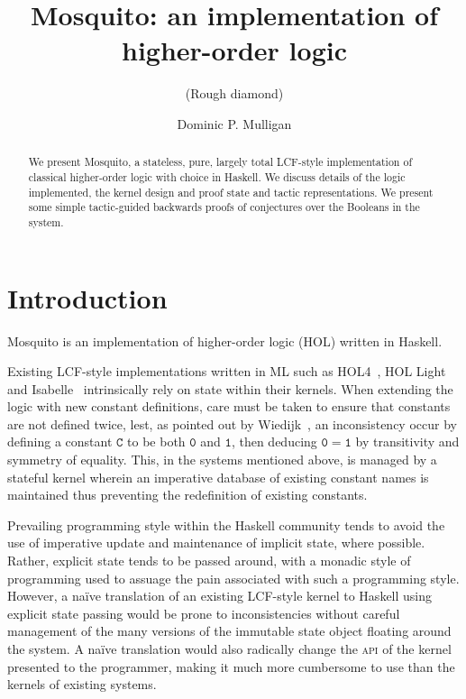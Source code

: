 \documentclass{llncs}
\author{Dominic P. Mulligan}
\title{Mosquito: an implementation of higher-order logic}
\subtitle{(Rough diamond)}
\institute{Computer Laboratory, University of Cambridge}
\newcommand{\mosquito}{Mosquito\xspace}
\begin{document}
\maketitle

\begin{abstract}
We present \mosquito, a stateless, pure, largely total LCF-style implementation of classical higher-order logic with choice in Haskell.
We discuss details of the logic implemented, the kernel design and proof state and tactic representations.
We present some simple tactic-guided backwards proofs of conjectures over the Booleans in the system.
\end{abstract}

\section{Introduction}
\label{sect.introduction}

\mosquito is an implementation of higher-order logic (HOL) written in Haskell.

Existing LCF-style implementations written in ML such as HOL4~\cite{gordon:introduction:1993}, HOL Light~\cite{harrison:hol:2009} and Isabelle~\cite{wenzel:isabelle:2008} intrinsically rely on state within their kernels.
When extending the logic with new constant definitions, care must be taken to ensure that constants are not defined twice, lest, as pointed out by Wiedijk~\cite{wiedijk:stateless:2011}, an inconsistency occur by defining a constant $\mathtt{C}$ to be both $\mathtt{0}$ and $\mathtt{1}$, then deducing $\mathtt{0 = 1}$ by transitivity and symmetry of equality.
This, in the systems mentioned above, is managed by a stateful kernel wherein an imperative database of existing constant names is maintained thus preventing the redefinition of existing constants.

Prevailing programming style within the Haskell community tends to avoid the use of imperative update and maintenance of implicit state, where possible.
Rather, explicit state tends to be passed around, with a monadic style of programming used to assuage the pain associated with such a programming style.
However, a na\"ive translation of an existing LCF-style kernel to Haskell using explicit state passing would be prone to inconsistencies without careful management of the many versions of the immutable state object floating around the system.
A na\"ive translation would also radically change the \textsc{api} of the kernel presented to the programmer, making it much more cumbersome to use than the kernels of existing systems.
\end{document}
